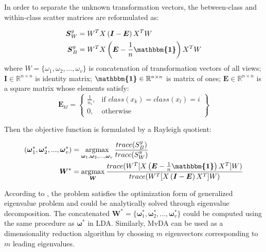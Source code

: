         In order to separate the unknown transformation vectors, the between-class and within-class scatter matrices are reformulated as:

        \begin{align}
            \boldsymbol{S}_W^y &= W^{T}X\left(\boldsymbol{I} - \boldsymbol{E}\right)X^{T}W\\
            \boldsymbol{S}_B^y &= W^{T}X\left(\boldsymbol{E} - \frac{1}{n}\boldsymbol{\mathbbm{1}}\right)X^{T}W
        \end{align}
        where $W = \{\omega_1,\omega_2,...,\omega_v\}$ is concatenation of transformation vectors of all views; $\boldsymbol{I} \in \mathbb{R}^{n\times n}$ is identity matrix; $\boldsymbol{\mathbbm{1}} \in \mathbb{R}^{n\times n}$ is matrix of ones; $\boldsymbol{E} \in \mathbb{R}^{n\times n}$ is a square matrix whose elements satisfy:
        \begin{equation}
            \boldsymbol{E}_{kl} = \left\{\begin{array}{lr}
                \frac{1}{n_i}, & \text{if } class(x_k) = class(x_l) = i\\
                0, & \text{otherwise}
                \end{array}\right\}
        \end{equation}

        Then the objective function is formulated by a Rayleigh quotient:

        \begin{align}
            (\boldsymbol{\omega}_1^*,\boldsymbol{\omega}_2^*, ..., \boldsymbol{\omega}_v^*) &= \operatorname*{argmax}_{\boldsymbol{\omega}_1, \boldsymbol{\omega}_2,..., \boldsymbol{\omega}_v}\frac{trace({S}_B^y)}{trace({S}_W^y)}\\
            \boldsymbol{W}^* &= \operatorname*{argmax}_{\boldsymbol{W}}\frac{trace(W^{T}[X\left(\boldsymbol{E} - \frac{1}{n}\boldsymbol{\mathbbm{1}}\right)X^{T}]W)}{trace(W^{T}[X\left(\boldsymbol{I} - \boldsymbol{E}\right)X^{T}]W)}
            \label{eq:MvDA}
        \end{align}

        According to \cite{kan2016multi}, the problem satisfies the optimization form of generalized eigenvalue problem and could be analytically solved through eigenvalue decomposition.
        The concatenated $\boldsymbol{W}^* = \{\boldsymbol{\omega}_1^*,\boldsymbol{\omega}_2^*, ..., \boldsymbol{\omega}_v^*\}$ could be computed using the same procedure as $\boldsymbol{\omega}^*$ in LDA.
        Similarly, MvDA can be used as a dimensionality reduction algorithm by choosing $m$ eigenvectors corresponding to $m$ leading eigenvalues.


